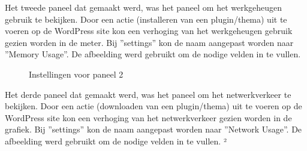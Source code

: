 Het tweede paneel dat gemaakt werd, was het paneel om het werkgeheugen gebruik te bekijken. Door een actie (installeren van een plugin/thema) uit te voeren op de WordPress site kon een verhoging van het werkgeheugen gebruik gezien worden in de meter. Bij ''settings'' kon de naam aangepast worden naar ''Memory Usage''. De afbeelding werd gebruikt om de nodige velden in te vullen.

\begin{figure}
    \centering
    \caption{Instellingen voor paneel 2 \autocite{Grafana}}
\end{figure}

\clearpage
Het derde paneel dat gemaakt werd, was het paneel om het netwerkverkeer te bekijken. Door een actie (downloaden van een plugin/thema) uit te voeren op de WordPress site kon een verhoging van het netwerkverkeer gezien worden in de grafiek. Bij ''settings'' kon de naam aangepast worden naar ''Network Usage''. De afbeelding werd gebruikt om de nodige velden in te vullen. ²

